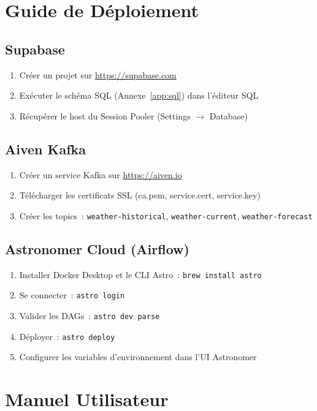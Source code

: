\documentclass[a4paper,12pt,oneside]{report}
\begin{document}
\chapter{Guide de Déploiement}
\label{app:deploy}

\section{Supabase}
\begin{enumerate}
  \item Créer un projet sur \url{https://supabase.com}
  \item Exécuter le schéma SQL (Annexe~\ref{app:sql}) dans l'éditeur SQL
  \item Récupérer le host du Session Pooler (Settings $\rightarrow$ Database)
\end{enumerate}

\section{Aiven Kafka}
\begin{enumerate}
  \item Créer un service Kafka sur \url{https://aiven.io}
  \item Télécharger les certificats SSL (ca.pem, service.cert, service.key)
  \item Créer les topics~: \texttt{weather-historical}, \texttt{weather-current}, \texttt{weather-forecast}
\end{enumerate}

\section{Astronomer Cloud (Airflow)}
\begin{enumerate}
  \item Installer Docker Desktop et le CLI Astro~: \texttt{brew install astro}
  \item Se connecter~: \texttt{astro login}
  \item Valider les DAGs~: \texttt{astro dev parse}
  \item Déployer~: \texttt{astro deploy}
  \item Configurer les variables d'environnement dans l'UI Astronomer
\end{enumerate}

\chapter{Manuel Utilisateur}
\label{app:user}
\end{document}
